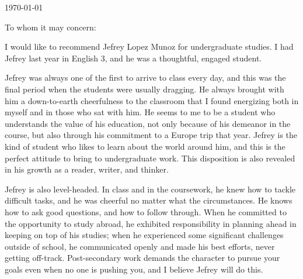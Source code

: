 \documentclass[11pt, letterpaper]{letter} %
\begin{document}

\begin{letter}{
	\today\\	
}


\opening{To whom it may concern:}

I would like to recommend Jefrey Lopez Munoz for undergraduate studies. I had Jefrey last year in English 3, and he was a thoughtful, engaged student.

Jefrey was always one of the first to arrive to class every day, and this was the final period when the students were usually dragging. He always brought with him a down-to-earth cheerfulness to the classroom that I found energizing both in myself and in those who sat with him. He seems to me to be a student who understands the value of his education, not only because of his demeanor in the course, but also through his commitment to a Europe trip that year. Jefrey is the kind of student who likes to learn about the world around him, and this is the perfect attitude to bring to undergraduate work. This disposition is also revealed in his growth as a reader, writer, and thinker.

Jefrey is also level-headed. In class and in the coursework, he knew how to tackle difficult tasks, and he was cheerful no matter what the circumstances. He knows how to ask good questions, and how to follow through. When he committed to the opportunity to study abroad, he exhibited responsibility in planning ahead in keeping on top of his studies; when he experienced some significant challenges outside of school, he communicated openly and made his best efforts, never getting off-track. Post-secondary work demands the character to pursue your goals even when no one is pushing you, and I believe Jefrey will do this.


\end{letter}
\end{document}
